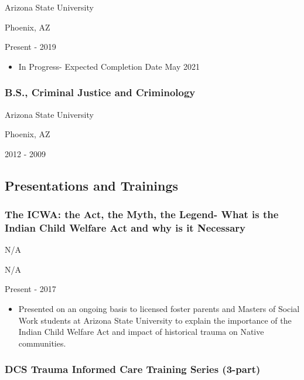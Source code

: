 \documentclass[
]{article}
\providecommand{\tightlist}{%
  \setlength{\itemsep}{0pt}\setlength{\parskip}{0pt}}
\begin{document}
Arizona State University

Phoenix, AZ

Present - 2019

\begin{itemize}
\tightlist
\item
  In Progress- Expected Completion Date May 2021
\end{itemize}

\hypertarget{b.s.-criminal-justice-and-criminology}{%
\subsubsection{B.S., Criminal Justice and
Criminology}\label{b.s.-criminal-justice-and-criminology}}

Arizona State University

Phoenix, AZ

2012 - 2009

\hypertarget{presentations-and-trainings}{%
\subsection{Presentations and
Trainings}\label{presentations-and-trainings}}

\hypertarget{the-icwa-the-act-the-myth-the-legend--what-is-the-indian-child-welfare-act-and-why-is-it-necessary}{%
\subsubsection{The ICWA: the Act, the Myth, the Legend- What is the
Indian Child Welfare Act and why is it
Necessary}\label{the-icwa-the-act-the-myth-the-legend--what-is-the-indian-child-welfare-act-and-why-is-it-necessary}}

N/A

N/A

Present - 2017

\begin{itemize}
\tightlist
\item
  Presented on an ongoing basis to licensed foster parents and Masters
  of Social Work students at Arizona State University to explain the
  importance of the Indian Child Welfare Act and impact of historical
  trauma on Native communities.
\end{itemize}

\hypertarget{dcs-trauma-informed-care-training-series-3-part}{%
\subsubsection{DCS Trauma Informed Care Training Series
(3-part)}\label{dcs-trauma-informed-care-training-series-3-part}}
\end{document}
